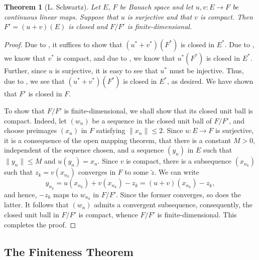 \documentclass[12pt]{article}
\theoremstyle{thmstyle}
\newtheorem{theorem}{Theorem}[section]
\theoremstyle{defstyle}
\newcommand{\wt}[1]{\widetilde{#1}}
\renewcommand{\le}{\leqslant}
\begin{document}
\begin{theorem}[L. Schwartz]
    Let $E$, $F$ be Banach space and let $u, v: E\to F$ be continuous linear maps. Suppose that $u$ is surjective and that $v$ is compact. Then $F' = (u + v)(E)$ is closed and $F/F'$ is finite-dimensional.
\end{theorem}
\begin{proof}
    Due to , it suffices to show that $(u^\ast + v^\ast)(F^\ast)$ is closed in $E^\ast$. Due to , we know that $v^\ast$ is compact, and due to , we know that $u^\ast(F^\ast)$ is closed in $E^\ast$. Further, since $u$ is surjective, it is easy to see that $u^\ast$ must be injective. Thus, due to , we see that $(u^\ast + v^\ast)(F^\ast)$ is closed in $E^\ast$, as desired. We have shown that $F'$ is closed in $F$.

    To show that $F/F'$ is finite-dimensional, we shall show that its closed unit ball is compact. Indeed, let $(w_n)$ be a sequence in the closed unit ball of $F/F'$, and choose preimages $(x_n)$ in $F$ satisfying $\|x_n\|\le 2$. Since $u: E\to F$ is surjective, it is a consequence of the open mapping theorem, that there is a constant $M > 0$, independent of the sequence chosen, and a sequence $(y_n)$ in $E$ such that $\|y_n\|\le M$ and $u(y_n) = x_n$. Since $v$ is compact, there is a subsequence $(x_{n_k})$ such that $z_k = v(x_{n_k})$ converges in $F$ to some $\wt z$. We can write 
    \begin{equation*}
        y_{n_k} = u(x_{n_k}) + v(x_{n_k}) - z_k = (u + v)(x_{n_k}) - z_k,
    \end{equation*}
    and hence, $-z_k$ maps to $w_{n_k}$ in $F/F'$. Since the former converges, so does the latter. It follows that $(w_n)$ admits a convergent subsequence, consequently, the closed unit ball in $F/F'$ is compact, whence $F/F'$ is finite-dimensional. This completes the proof.
\end{proof}

\subsection{The Finiteness Theorem}



\end{document}
